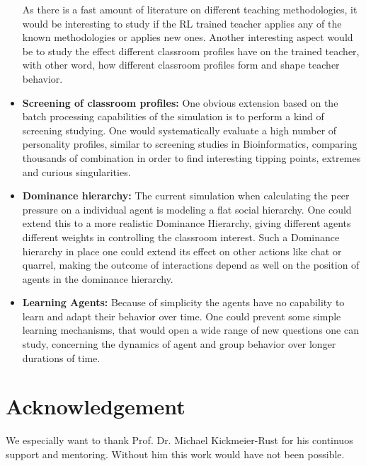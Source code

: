 \begin{itemize}
    \bb

    As there is a fast amount of literature on different teaching methodologies,
    it would be interesting to study if the RL trained teacher applies any of the known
    methodologies or applies new ones. Another interesting aspect would be to study the
    effect different classroom profiles have on the trained teacher, with other
    word, how different classroom profiles form and shape teacher behavior.

    \item \textbf{Screening of classroom profiles:} One obvious extension based
    on the batch processing capabilities of the simulation is to perform a kind
    of screening studying. One would systematically evaluate a high number of personality
    profiles, similar to screening studies in Bioinformatics, comparing thousands
    of combination in order to find interesting tipping points, extremes and curious
    singularities.

    \item \textbf{Dominance hierarchy:} The current simulation when calculating
    the peer pressure on a individual agent is modeling a flat social hierarchy.
    One could extend this to a more realistic Dominance Hierarchy, giving different
    agents different weights in controlling the classroom interest. Such a Dominance
    hierarchy in place one could extend its effect on other actions like chat or
    quarrel, making the outcome of interactions depend as well on the position
    of agents in the dominance hierarchy.

    \item \textbf{Learning Agents:} Because of simplicity the agents have no capability
    to learn and adapt their behavior over time. One could prevent some simple learning
    mechanisms, that would open a wide range of new questions one can study, concerning
    the dynamics of agent and group behavior over longer durations of time.
\end{itemize}

\section{Acknowledgement}
We especially want to thank Prof. Dr. Michael Kickmeier-Rust for his continuos
support and mentoring. Without him this work would have not been possible.

